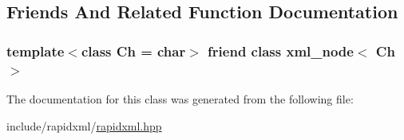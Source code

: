 \subsection{Friends And Related Function Documentation}
\hypertarget{classrapidxml_1_1xml__attribute_aa7e464ce3fe512598ff8dda47291941f}{
\subsubsection[{xml\_\-node$<$ Ch $>$}]{\setlength{\rightskip}{0pt plus 5cm}template$<$class Ch = char$>$ friend class {\bf xml\_\-node}$<$ Ch $>$}}
\label{d9/db7/classrapidxml_1_1xml__attribute_aa7e464ce3fe512598ff8dda47291941f}


The documentation for this class was generated from the following file:\begin{DoxyCompactItemize}
\item 
include/rapidxml/\hyperlink{rapidxml_8hpp}{rapidxml.hpp}\end{DoxyCompactItemize}
